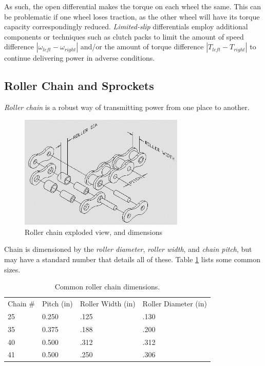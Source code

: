 As such, the open differential makes the torque on each wheel the same. This can be problematic if one wheel loses traction, as the other wheel will have its torque capacity correspondingly reduced.  \textit{Limited-slip} differentials employ additional components or techniques such as clutch packs to limit the amount of speed difference $|\omega_{left} - \omega_{right}|$ and/or the amount of torque difference $|T_{left} - T_{right}|$ to continue delivering power in adverse conditions. 

\newpage

\subsection{Roller Chain and Sprockets}

\textit{Roller chain} is a robust way of transmitting power from one place to another. 

\begin{figure}[H]
	\includegraphics[width=0.7\textwidth]{imgs/rollerchain_nomenclature.png}
	\caption{Roller chain exploded view, and dimensions}
\end{figure}

Chain is dimensioned by the \textit{roller diameter}, \textit{roller width}, and \textit{chain pitch}, but may have a standard number that details all of these. Table \ref{table:chaindims} lists some common sizes.

\begin{table}[H] 
\begin{tabular}{llll}
Chain \# & Pitch (in) & Roller Width (in) & Roller Diameter (in) \\
25       & 0.250      & .125              & .130                 \\
35       & 0.375      & .188              & .200                 \\
40       & 0.500      & .312              & .312                 \\
41       & 0.500      & .250              & .306                
\end{tabular}
\caption{Common roller chain dimensions.}
\label{table:chaindims}
\end{table}

